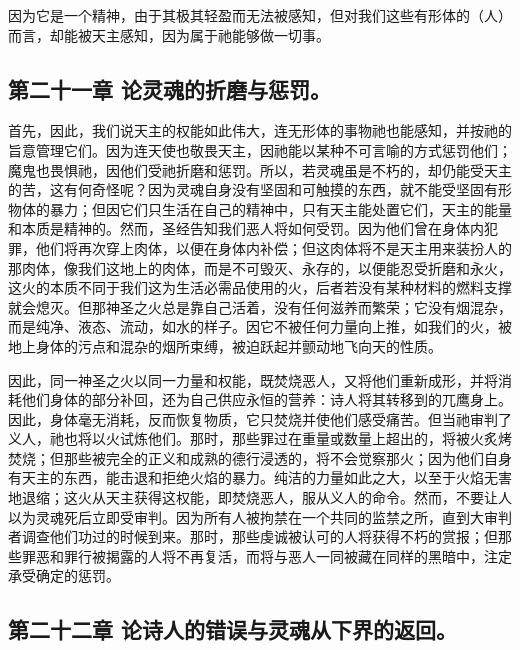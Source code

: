 因为它是一个精神，由于其极其轻盈而无法被感知，但对我们这些有形体的（人）而言，却能被天主感知，因为属于祂能够做一切事。\par


\subsection{第二十一章 论灵魂的折磨与惩罚。}

首先，因此，我们说天主的权能如此伟大，连无形体的事物祂也能感知，并按祂的旨意管理它们。因为连天使也敬畏天主，因祂能以某种不可言喻的方式惩罚他们；魔鬼也畏惧祂，因他们受祂折磨和惩罚。所以，若灵魂虽是不朽的，却仍能受天主的苦，这有何奇怪呢？因为灵魂自身没有坚固和可触摸的东西，就不能受坚固有形物体的暴力；但因它们只生活在自己的精神中，只有天主能处置它们，天主的能量和本质是精神的。然而，圣经告知我们恶人将如何受罚。因为他们曾在身体内犯罪，他们将再次穿上肉体，以便在身体内补偿；但这肉体将不是天主用来装扮人的那肉体，像我们这地上的肉体，而是不可毁灭、永存的，以便能忍受折磨和永火，这火的本质不同于我们这为生活必需品使用的火，后者若没有某种材料的燃料支撑就会熄灭。但那神圣之火总是靠自己活着，没有任何滋养而繁荣；它没有烟混杂，而是纯净、液态、流动，如水的样子。因它不被任何力量向上推，如我们的火，被地上身体的污点和混杂的烟所束缚，被迫跃起并颤动地飞向天的性质。\par

因此，同一神圣之火以同一力量和权能，既焚烧恶人，又将他们重新成形，并将消耗他们身体的部分补回，还为自己供应永恒的营养：诗人将其转移到的兀鹰身上。因此，身体毫无消耗，反而恢复物质，它只焚烧并使他们感受痛苦。但当祂审判了义人，祂也将以火试炼他们。那时，那些罪过在重量或数量上超出的，将被火炙烤焚烧；但那些被完全的正义和成熟的德行浸透的，将不会觉察那火；因为他们自身有天主的东西，能击退和拒绝火焰的暴力。纯洁的力量如此之大，以至于火焰无害地退缩；这火从天主获得这权能，即焚烧恶人，服从义人的命令。然而，不要让人以为灵魂死后立即受审判。因为所有人被拘禁在一个共同的监禁之所，直到大审判者调查他们功过的时候到来。那时，那些虔诚被认可的人将获得不朽的赏报；但那些罪恶和罪行被揭露的人将不再复活，而将与恶人一同被藏在同样的黑暗中，注定承受确定的惩罚。\par


\subsection{第二十二章 论诗人的错误与灵魂从下界的返回。}

